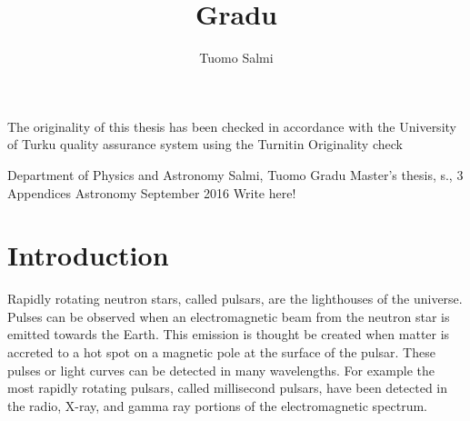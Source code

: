 \documentclass{wihuri}
\begin{document}

\title{Gradu}
\author{Tuomo Salmi}

\maketitle
\newpage
\thispagestyle{empty}
\vspace*{10cm}

\vfill

  
\hspace*{-2cm}\parbox{\textwidth}{The originality of this thesis has been checked in accordance with the University of Turku quality assurance system using the Turnitin Originality check}
  


\newpage


\begin{tiivistelma}%
        {Department of Physics and Astronomy}%
        {Salmi, Tuomo}%
        {Gradu}
        {Master's thesis, \pageref{LastPage} s., 3 Appendices}%
        {Astronomy}%
        {September 2016}%
	Write here!
\end{tiivistelma}




\tableofcontents %
\newpage
\section*{Introduction}

Rapidly rotating neutron stars, called pulsars, are the lighthouses of the universe. Pulses can be observed when an electromagnetic beam from the neutron star is emitted towards the Earth.  This emission is thought be created when matter is accreted to a hot spot on a magnetic pole at the surface of the pulsar. These pulses or light curves can be detected in many wavelengths. For example the most rapidly rotating pulsars, called millisecond pulsars, have been detected in the radio, X-ray, and gamma ray portions of the electromagnetic spectrum.
\end{document}
